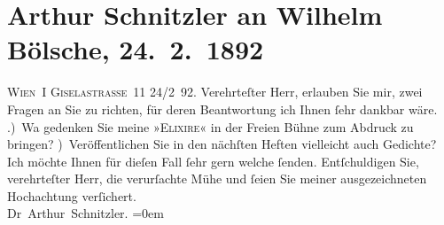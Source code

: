 

         
         \renewcommand{\erwaehntePersonen}{Personen: Wilhelm Bölsche}
         \renewcommand{\erwaehnteOrte}{Orte: Berlin, Bösendorferstraße, Wien}
         \renewcommand{\erwaehnteWerke}{Werke: Die drei Elixire, Freie Bühne für den Entwickelungskampf der Zeit}
               \section[Arthur Schnitzler an Wilhelm Bölsche, 24. 2. 1892]{ Arthur Schnitzler an Wilhelm Bölsche, 24. 2. 1892}\nopagebreak{}\rehead{ }\begin{ledgroupsized}[t]{13cm}\normalsize\beginnumbering \toendnotes[C]{\smallbreak\pagebreak[2]} 
\pstart
           \noindent{}{\pb}\textsc{Wien I Giselastraße 11}\pend
           \pstart
           \raggedleft{}24/2 92.\pend
           \pstart{}Verehrteſter Herr,\pend\pstart
           erlauben Sie mir, zwei Fragen an Sie zu richten, für deren Beantwortung ich Ihnen
               ſehr dankbar wäre.\pend
           .) Wa{\geminationn} gedenken Sie meine »\textsc{Elixire}« in der Freien Bühne zum Abdruck zu
               bringen?\pend
           ) Veröffentlichen Sie in den nächſten Heften vielleicht auch Gedichte? Ich möchte
                  {\pb}Ihnen für dieſen Fall ſehr gern welche ſenden.\pend
           \pstart
           Entſchuldigen Sie, verehrteſter Herr, die verurſachte Mühe und ſeien Sie meiner
               ausgezeichneten Hochachtung verſichert.{\\[\baselineskip]}\spacefill\mbox{Dr Arthur Schnitzler.}\pend
           \leftskip=0em{}
         
         \endnumbering{}\end{ledgroupsized}  \newcommand{\dateiname}{L00076}\newcommand{\titel}{Arthur Schnitzler an Wilhelm Bölsche, 24. 2. 1892}\newcommand{\editorInnen}{Martin Anton Müller und Gerd-Hermann Susen}
      